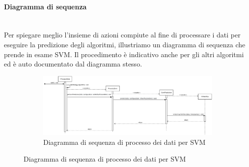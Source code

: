\paragraph*{Diagramma di sequenza} \mbox{}\\ [1mm]
Per spiegare meglio l'insieme di azioni compiute al fine di processare i dati per eseguire la predizione degli algoritmi, illustriamo un diagramma di sequenza che prende in esame SVM\glo. Il procedimento è indicativo anche per gli altri algoritmi ed è auto documentato dal diagramma stesso.
\mbox{}
\begin{landscape}
	\begin{figure}
		\begin{figure} [H]
			\includegraphics[width=\linewidth]{./img/Diagrammi/ds-plug-in.png}
			\caption{Diagramma di sequenza di processo dei dati per SVM}
		\end{figure}
	\end{figure}
\end{landscape}
